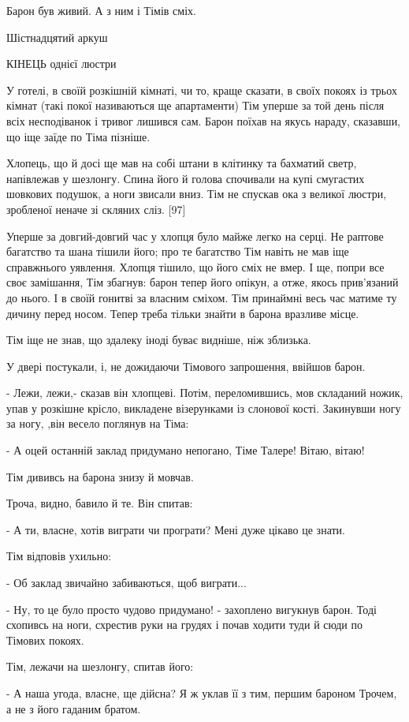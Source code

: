 Барон був живий. А з ним і Тімів сміх.

Шістнадцятий аркуш

КІНЕЦЬ однієї люстри

У готелі, в своїй розкішній кімнаті, чи то, краще сказати, в своїх покоях із трьох кімнат (такі покої називаються ще апартаменти) Тім уперше за той день після всіх несподіванок і тривог лишився сам. Барон поїхав на якусь нараду, сказавши, що іще заїде по Тіма пізніше.

Хлопець, що й досі ще мав на собі штани в клітинку та бахматий светр, напівлежав у шезлонгу. Спина його й голова спочивали на купі смугастих шовкових подушок, а ноги звисали вниз. Тім не спускав ока з великої люстри, зробленої неначе зі скляних сліз. [97]

Уперше за довгий-довгий час у хлопця було майже легко на серці. Не раптове багатство та шана тішили його; про те багатство Тім навіть не мав іще справжнього уявлення. Хлопця тішило, що його сміх не вмер. І ще, попри все своє замішання, Тім збагнув: барон тепер його опікун, а отже, якось прив'язаний до нього. І в своїй гонитві за власним сміхом. Тім принаймні весь час матиме ту дичину перед носом. Тепер треба тільки знайти в барона вразливе місце.

Тім іще не знав, що здалеку іноді буває видніше, ніж зблизька.

У двері постукали, і, не дожидаючи Тімового запрошення, ввійшов барон.

- Лежи, лежи,- сказав він хлопцеві. Потім, переломившись, мов складаний ножик, упав у розкішне крісло, викладене візерунками із слонової кості. Закинувши ногу за ногу, ,він весело поглянув на Тіма:

- А оцей останній заклад придумано непогано, Тіме Талере! Вітаю, вітаю!

Тім дививсь на барона знизу й мовчав.

Троча, видно, бавило й те. Він спитав:

- А ти, власне, хотів виграти чи програти? Мені дуже цікаво це знати.

Тім відповів ухильно:

- Об заклад звичайно забиваються, щоб виграти...

- Ну, то це було просто чудово придумано! - захоплено вигукнув барон. Тоді схопивсь на ноги, схрестив руки на грудях і почав ходити туди й сюди по Тімових покоях.

Тім, лежачи на шезлонгу, спитав його:

- А наша угода, власне, ще дійсна? Я ж уклав її з тим, першим бароном Трочем, а не з його гаданим братом.

